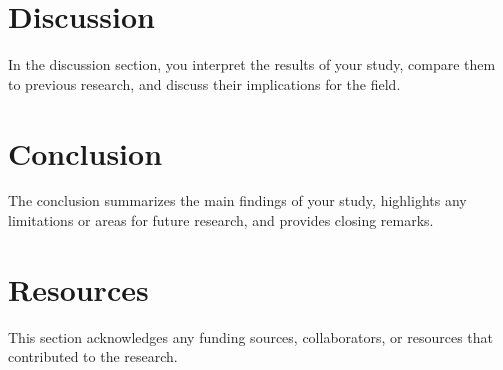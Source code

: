\documentclass{article}
\begin{document}
\section{Discussion}
\lipsum[5]
In the discussion section, you interpret the results of your study, compare them to previous research, and discuss their implications for the field.

\section{Conclusion}
\lipsum[6]
The conclusion summarizes the main findings of your study, highlights any limitations or areas for future research, and provides closing remarks.

\section{Resources}
\lipsum[7]
This section acknowledges any funding sources, collaborators, or resources that contributed to the research.
\end{document}
